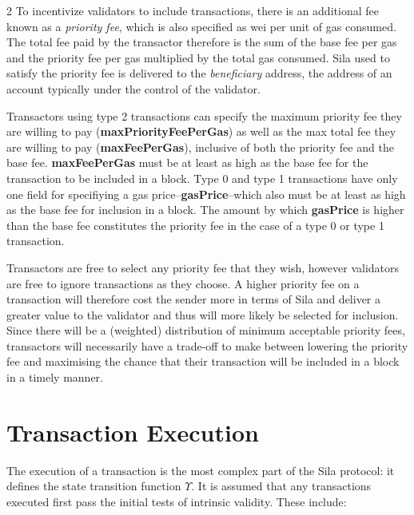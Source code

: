 \documentclass[9pt,oneside]{amsart}
\begin{document}
\begin{multicols}{2}
To incentivize validators to include transactions, there is an additional fee known as a \textit{priority fee}, which is also specified as wei per unit of gas consumed. The total fee paid by the transactor therefore is the sum of the base fee per gas and the priority fee per gas multiplied by the total gas consumed. Sila used to satisfy the priority fee is delivered to the \textit{beneficiary} address, the address of an account typically under the control of the validator.

Transactors using type 2 transactions can specify the maximum priority fee they are willing to pay (\textbf{maxPriorityFeePerGas}) as well as the max total fee they are willing to pay (\textbf{maxFeePerGas}), inclusive of both the priority fee and the base fee. \textbf{maxFeePerGas} must be at least as high as the base fee for the transaction to be included in a block. Type 0 and type 1 transactions have only one field for specifiying a gas price--\textbf{gasPrice}--which also must be at least as high as the base fee for inclusion in a block. The amount by which \textbf{gasPrice} is higher than the base fee constitutes the priority fee in the case of a type 0 or type 1 transaction.

Transactors are free to select any priority fee that they wish, however validators are free to ignore transactions as they choose. A higher priority fee on a transaction will therefore cost the sender more in terms of Sila and deliver a greater value to the validator and thus will more likely be selected for inclusion. Since there will be a (weighted) distribution of minimum acceptable priority fees, transactors will necessarily have a trade-off to make between lowering the priority fee and maximising the chance that their transaction will be included in a block in a timely manner.


\section{Transaction Execution} \label{ch:transactions}

The execution of a transaction is the most complex part of the Sila protocol: it defines the state transition function \hyperlink{Upsilon_state_transition}{$\Upsilon$}. It is assumed that any transactions executed first pass the initial tests of intrinsic validity. These include:


\end{multicols}
\end{document}
